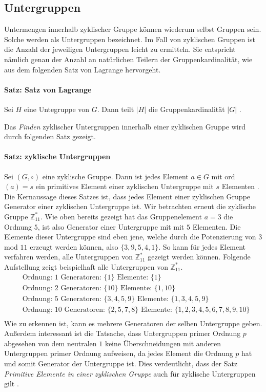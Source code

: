 \subsection{Untergruppen} \label{sec:untergruppen}
Untermengen innerhalb zyklischer Gruppe können wiederum selbst Gruppen sein. Solche werden als Untergruppen bezeichnet. Im Fall von zyklischen Gruppen ist die Anzahl der jeweiligen Untergruppen leicht zu ermitteln. Sie entspricht nämlich genau der Anzahl an natürlichen Teilern der Gruppenkardinalität, wie aus dem folgenden Satz von Lagrange hervorgeht.

\paragraph{Satz: Satz von Lagrange}
Sei $H$ eine Untegruppe von $G$. Dann teilt $|H|$ die Gruppenkardinalität $|G|$ \cite[S. 245]{Paar.2016}.

Das \textit{Finden} zyklischer Untergruppen innerhalb einer zyklischen Gruppe wird durch folgenden Satz gezeigt.

\paragraph{Satz: zyklische Untergruppen}
Sei $(G, \circ)$ eine zyklische Gruppe. Dann ist jedes Element $a \in G$ mit ord$(a) = s$ ein primitives Element einer zyklischen Untergruppe mit $s$ Elementen \cite[S. 244]{Paar.2016}.\\

Die Kernaussage dieses Satzes ist, dass jedes Element einer zyklischen Gruppe Generator einer zyklischen Untergruppe ist.  Wir betrachten erneut die zyklische Gruppe $\mathbb{Z}^*_{11}$. Wie oben bereits gezeigt hat das Gruppenelement $a=3$ die Ordnung $5$, ist also Generator einer Untergruppe mit mit $5$ Elementen. Die Elemente dieser Untergruppe sind eben jene, welche durch die Potenzierung von $3$ mod $11$ erzeugt werden können, also $\{3,9,5,4,1\}$. So kann für jedes Element verfahren werden, alle Untergruppen von $\mathbb{Z}^*_{11}$ gezeigt werden können. Folgende Aufstellung zeigt beispielhaft alle Untergruppen von $\mathbb{Z}^*_{11}$.
\begin{align*}
&\text{Ordnung: } 1 \text{ Generatoren: } \{1\} \text{ Elemente: }\{1\}\\
&\text{Ordnung: } 2 \text{ Generatoren: } \{10\} \text{ Elemente: }\{1,10\}\\
&\text{Ordnung: } 5 \text{ Generatoren: } \{3,4,5,9\} \text{ Elemente: }\{1,3,4,5,9\}\\
&\text{Ordnung: } 10 \text{ Generatoren: } \{2,5,7,8\} \text{ Elemente: } \{1,2,3,4,5,6,7,8,9,10\}\\
\end{align*}
Wie zu erkennen ist, kann es mehrere Generatoren der selben Untergruppe geben. Außerdem interessant ist die Tatsache, dass Untergruppen primer Ordnung $p$ abgesehen von dem neutralen $1$ keine Überschneidungen mit anderen Untergruppen primer Ordnung aufweisen, da jedes Element die Ordnung $p$ hat und somit Generator der Untergruppe ist. Dies verdeutlicht, dass der Satz \textit{Primitive Elemente in einer zyklischen Gruppe} auch für zyklische Untergruppen gilt \cite[S. 244-246]{Paar.2016}.

